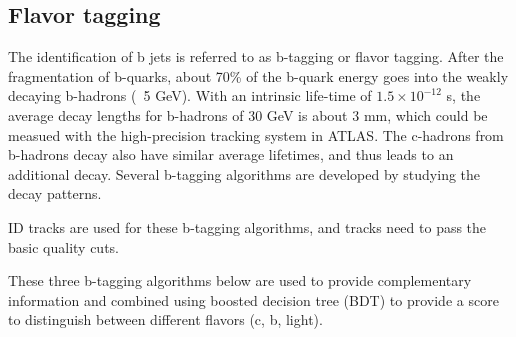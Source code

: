 \subsection{Flavor tagging}
\label{sec:track}
\par The identification of b jets is referred to as b-tagging or flavor tagging. After the fragmentation of b-quarks, about 70\% of the b-quark energy goes into the weakly decaying b-hadrons (~5 GeV). With an intrinsic life-time of $1.5 \times 10^{−12}$ s, the average decay lengths for b-hadrons of 30 GeV is about 3 mm, which could be measued with the high-precision tracking system in ATLAS.
The c-hadrons from b-hadrons decay also have similar average lifetimes, and thus leads to an additional decay. 
Several b-tagging algorithms are developed by studying the decay patterns. 				
\par ID tracks are used for these b-tagging algorithms, and tracks need to pass the basic quality cuts. 		
\par These three b-tagging algorithms below are used to provide complementary information and combined using boosted decision tree (BDT) to provide a score to distinguish between different flavors (c, b, light). 	
